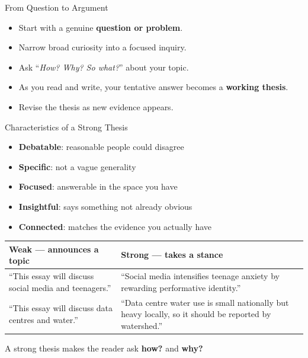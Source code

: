 \documentclass[aspectratio=169]{beamer}
\begin{document}
\begin{frame}{From Question to Argument}
\begin{itemize}
  \item Start with a genuine \textbf{question or problem}.
  \item Narrow broad curiosity into a focused inquiry.
  \item Ask “\emph{How? Why? So what?}” about your topic.
  \item As you read and write, your tentative answer becomes a \textbf{working thesis}.
  \item Revise the thesis as new evidence appears.
\end{itemize}
\end{frame}

\begin{frame}{Characteristics of a Strong Thesis}
\begin{itemize}
  \item \textbf{Debatable}: reasonable people could disagree
  \item \textbf{Specific}: not a vague generality
  \item \textbf{Focused}: answerable in the space you have
  \item \textbf{Insightful}: says something not already obvious
  \item \textbf{Connected}: matches the evidence you actually have
\end{itemize}
\vspace{1ex}
\small
\begin{tabular}{@{}p{}p{}@{}}
\toprule
\textbf{Weak} --- announces a topic & \textbf{Strong} --- takes a stance \\
\midrule
``This essay will discuss social media and teenagers.'' &
``Social media intensifies teenage anxiety by rewarding performative
identity.'' \\
\addlinespace
``This essay will discuss data centres and water.'' &
``Data centre water use is small nationally but heavy locally, so it should
be reported by watershed.'' \\
\bottomrule
\end{tabular}
\vspace{1ex}

A strong thesis makes the reader ask \textbf{how?} and \textbf{why?}
\end{frame}
\end{document}
